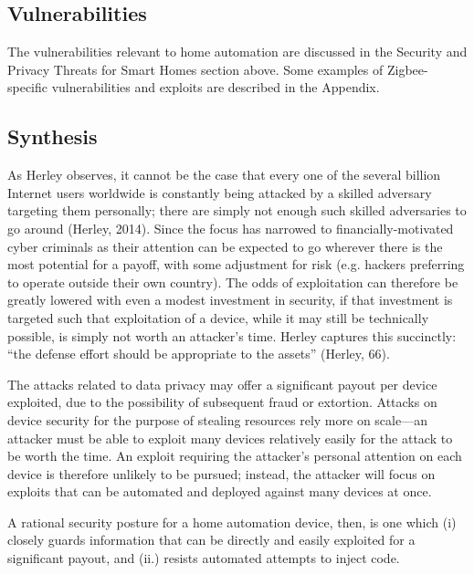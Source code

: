 \subsection{Vulnerabilities}
The vulnerabilities relevant to home automation are discussed in the Security and Privacy Threats for Smart Homes section above. Some examples of Zigbee-specific vulnerabilities and exploits are described in the Appendix.

\subsection{Synthesis}
As Herley observes, it cannot be the case that every one of the several billion Internet users worldwide is constantly being attacked by a skilled adversary targeting them personally; there are simply not enough such skilled adversaries to go around (Herley, 2014). Since the focus has narrowed to financially-motivated cyber criminals as their attention can be expected to go wherever there is the most potential for a payoff, with some adjustment for risk (e.g. hackers preferring to operate outside their own country). The odds of exploitation can therefore be greatly lowered with even a modest investment in security, if that investment is targeted such that exploitation of a device, while it may still be technically possible, is simply not worth an attacker’s time. Herley captures this succinctly: “the defense effort should be appropriate to the assets” (Herley, 66).

The attacks related to data privacy may offer a significant payout per device exploited, due to the possibility of subsequent fraud or extortion. Attacks on device security for the purpose of stealing resources rely more on scale---an attacker must be able to exploit many devices relatively easily for the attack to be worth the time. An exploit requiring the attacker’s personal attention on each device is therefore unlikely to be pursued; instead, the attacker will focus on exploits that can be automated and deployed against many devices at once.

A rational security posture for a home automation device, then, is one which (i) closely guards information that can be directly and easily exploited for a significant payout, and (ii.) resists automated attempts to inject code.
